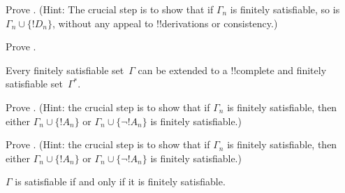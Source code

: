 \documentclass[../../../include/open-logic-section]{subfiles}
\begin{document}
\begin{prob}
Prove . (Hint: The crucial step
is to show that if $\Gamma_n$ is finitely satisfiable, so is $\Gamma_n
\cup \{!D_n\}$, without any appeal to !!{derivation}s or consistency.)
\end{prob}
\tagendprob


\begin{prob}
Prove .
\end{prob}
\tagendprob

\begin{lem}
 Every finitely satisfiable set~$\Gamma$
can be extended to a !!{complete} and finitely satisfiable
set~$\Gamma^*$.
\end{lem}

\begin{prob}
Prove .  (Hint: the crucial
step is to show that if $\Gamma_n$ is finitely satisfiable, then
either $\Gamma_n \cup \{!A_n\}$ or $\Gamma_n \cup \{\lnot !A_n\}$ is
finitely satisfiable.)
\end{prob}
\tagendprob

\begin{prob}
Prove .  (Hint: the crucial
step is to show that if $\Gamma_n$ is finitely satisfiable, then
either $\Gamma_n \cup \{!A_n\}$ or $\Gamma_n \cup \{\lnot !A_n\}$ is
finitely satisfiable.)
\end{prob}
\tagendprob

\begin{thm}[Compactness]
 $\Gamma$ is satisfiable if and only
if it is finitely satisfiable.
\end{thm}
\end{document}
